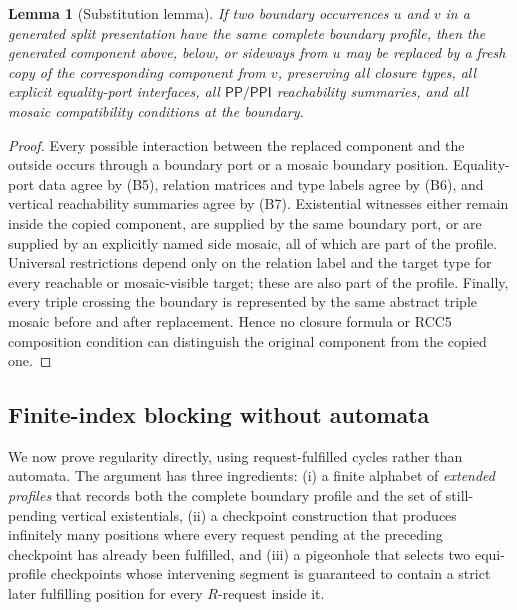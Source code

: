 \documentclass[11pt]{article}
\newtheorem{lemma}[theorem]{Lemma}
\newcommand{\PP}{\mathsf{PP}}
\newcommand{\PPI}{\mathsf{PPI}}
\begin{document}
\begin{lemma}[Substitution lemma]\label{lem:substitution}
If two boundary occurrences $u$ and $v$ in a generated split presentation have the same complete boundary profile, then the generated component above, below, or sideways from $u$ may be replaced by a fresh copy of the corresponding component from $v$, preserving all closure types, all explicit equality-port interfaces, all $\PP/\PPI$ reachability summaries, and all mosaic compatibility conditions at the boundary.
\end{lemma}

\begin{proof}
Every possible interaction between the replaced component and the outside occurs through a boundary port or a mosaic boundary position.  Equality-port data agree by (B5), relation matrices and type labels agree by (B6), and vertical reachability summaries agree by (B7).  Existential witnesses either remain inside the copied component, are supplied by the same boundary port, or are supplied by an explicitly named side mosaic, all of which are part of the profile.  Universal restrictions depend only on the relation label and the target type for every reachable or mosaic-visible target; these are also part of the profile.  Finally, every triple crossing the boundary is represented by the same abstract triple mosaic before and after replacement.  Hence no closure formula or RCC5 composition condition can distinguish the original component from the copied one.
\end{proof}

\subsection{Finite-index blocking without automata}

We now prove regularity directly, using request-fulfilled cycles
rather than automata.  The argument has three ingredients: (i) a
finite alphabet of \emph{extended profiles} that records both the
complete boundary profile and the set of still-pending vertical
existentials, (ii) a checkpoint construction that produces
infinitely many positions where every request pending at the
preceding checkpoint has already been fulfilled, and (iii) a
pigeonhole that selects two equi-profile checkpoints whose
intervening segment is guaranteed to contain a strict later
fulfilling position for every $R$-request inside it.
\end{document}
